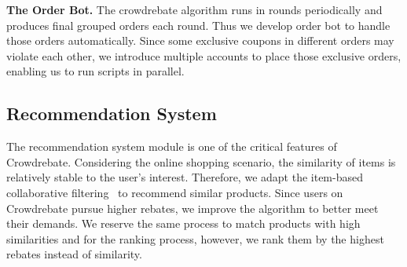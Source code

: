 \textbf{The Order Bot.} The crowdrebate algorithm runs in rounds periodically and produces final grouped orders each round. Thus we develop order bot to handle those orders automatically. Since some exclusive coupons in different orders may violate each other, we introduce multiple accounts to place those exclusive orders, enabling us to run scripts in parallel.

\subsection{Recommendation System}

The recommendation system module is one of the critical features of Crowdrebate. Considering the online shopping scenario, the similarity of items is relatively stable to the user’s interest. Therefore, we adapt the item-based collaborative filtering~\cite{sarwar2001item} to recommend similar products. Since users on Crowdrebate pursue higher rebates, we improve the algorithm to better meet their demands. We reserve the same process to match products with high similarities and for the ranking process, however, we rank them by the highest rebates instead of similarity.